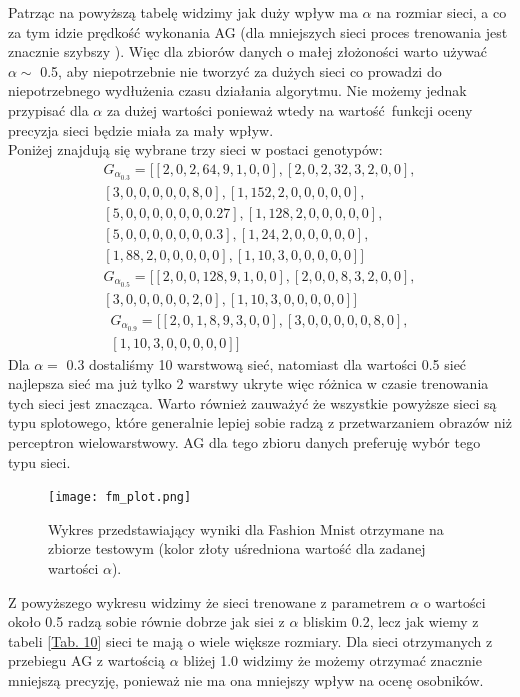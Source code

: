 \documentclass{article}
\begin{document}
Patrząc na powyższą tabelę widzimy jak duży wpływ ma $\alpha$ na rozmiar sieci, a co
za tym idzie prędkość wykonania AG (dla mniejszych sieci proces trenowania jest znacznie szybszy
). Więc dla zbiorów danych o małej złożoności warto używać $\alpha \sim$ 0.5, aby niepotrzebnie
nie tworzyć za dużych sieci co prowadzi do niepotrzebnego wydłużenia czasu działania algorytmu.
Nie możemy jednak przypisać dla $\alpha$ za dużej wartości ponieważ wtedy na wartość funkcji
oceny precyzja sieci będzie miała za mały wpływ.\\
Poniżej znajdują się wybrane trzy sieci w postaci genotypów:
\begin{align*}
	G_{\alpha_{0.3}} = \big[[2, 0, 2, 64, 9, 1, 0, 0], [2, 0, 2, 32, 3, 2, 0, 0],\\
	                        [3, 0, 0, 0, 0, 0, 8, 0], [1, 152, 2, 0, 0, 0, 0, 0],\\
				[5, 0, 0, 0, 0, 0, 0, 0.27], [1, 128, 2, 0, 0, 0, 0, 0],\\
				[5, 0, 0, 0, 0, 0, 0, 0.3], [1, 24, 2, 0, 0, 0, 0, 0],\\
				[1, 88, 2, 0, 0, 0, 0, 0], [1, 10, 3, 0, 0, 0, 0, 0] \big]
\end{align*}
\begin{align*}
	G_{\alpha_{0.5}} = \big[[2, 0, 0, 128, 9, 1, 0, 0], [2, 0, 0, 8, 3, 2, 0, 0],\\
	                   [3, 0, 0, 0, 0, 0, 2, 0], [1, 10, 3, 0, 0, 0, 0, 0]\big]
\end{align*}
\begin{align*}
	 G_{\alpha_{0.9}} = \big[[2, 0, 1, 8, 9, 3, 0, 0], [3, 0, 0, 0, 0, 0, 8, 0],\\
	                         [1, 10, 3, 0, 0, 0, 0, 0]\big]
\end{align*}
Dla $\alpha = $ 0.3 dostaliśmy 10 warstwową sieć,  natomiast dla wartości 0.5 
sieć najlepsza sieć ma już tylko 2 warstwy ukryte więc różnica w czasie trenowania tych sieci
jest znacząca. Warto również zauważyć że wszystkie powyższe sieci są typu splotowego, które
generalnie lepiej sobie radzą z przetwarzaniem obrazów niż perceptron wielowarstwowy.
AG dla tego zbioru danych preferuję wybór tego typu sieci.
\begin{figure}[H]
\centering
\texttt{[image: fm\_plot.png]}
\caption{Wykres przedstawiający wyniki dla Fashion Mnist otrzymane na zbiorze testowym
(kolor złoty uśredniona wartość dla zadanej wartości $\alpha$).}
\end{figure}

Z powyższego wykresu widzimy że sieci trenowane z parametrem $\alpha$ o wartości około 0.5
radzą sobie równie dobrze jak siei z $\alpha$ bliskim 0.2, lecz jak wiemy z tabeli 
[\hyperref[tab:fmres]{Tab. 10}] sieci te mają o wiele większe rozmiary. Dla sieci otrzymanych
z przebiegu AG z wartością $\alpha$ bliżej 1.0 widzimy że możemy otrzymać znacznie mniejszą
precyzję, ponieważ nie ma ona mniejszy wpływ na ocenę osobników.
\end{document}
